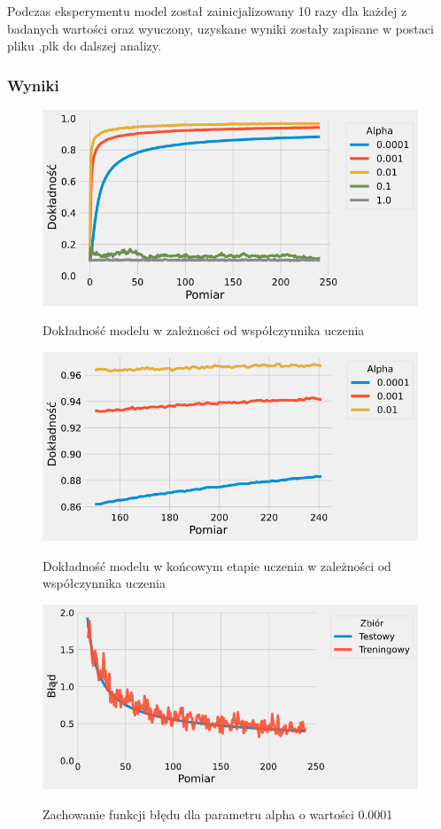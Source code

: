 \documentclass{article}
\begin{document}
Podczas eksperymentu model został zainicjalizowany 10 razy dla każdej z badanych wartości oraz wyuczony, uzyskane wyniki zostały zapisane w postaci pliku .plk do dalszej analizy.

\subsubsection*{Wyniki}
\begin{figure}[H]
	\centering
	\caption{Dokładność modelu w zależności od współczynnika uczenia}
	\includegraphics[width=\textwidth]{alpha_acc.png}
	\label{fig:res41}
\end{figure}
\begin{figure}[H]
	\centering
	\caption{Dokładność modelu w końcowym etapie uczenia w zależności od współczynnika uczenia}
	\includegraphics[width=\textwidth]{alpha_acc_zoom.png}
	\label{fig:res42}
\end{figure}
\begin{figure}[H]
	\centering
	\caption{Zachowanie funkcji błędu dla parametru alpha o wartości 0.0001}
	\includegraphics[width=\textwidth]{alpha_err_00001.png}
	\label{fig:res43}
\end{figure}
\end{document}
